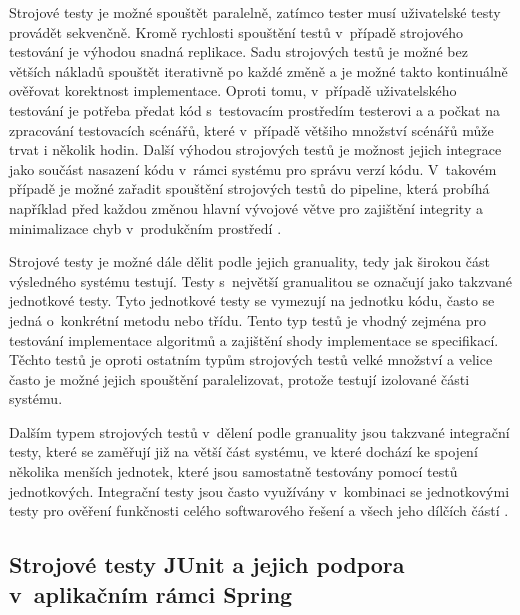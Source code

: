 Strojové testy je možné spouštět paralelně, zatímco tester musí uživatelské testy provádět sekvenčně. Kromě rychlosti spouštění testů v~případě strojového testování je výhodou snadná replikace. Sadu strojových testů je možné bez větších nákladů spouštět iterativně po každé změně a je možné takto kontinuálně ověřovat korektnost implementace. Oproti tomu, v~případě uživatelského testování je potřeba předat kód s~testovacím prostředím testerovi a a počkat na zpracování testovacích scénářů, které v~případě většiho množství scénářů může trvat i několik hodin. Další výhodou strojových testů je možnost jejich integrace jako součást nasazení kódu v~rámci systému pro správu verzí kódu. V~takovém případě je možné zařadit spouštění strojových testů do pipeline, která probíhá například před každou změnou hlavní vývojové větve pro zajištění integrity a minimalizace chyb v~produkčním prostředí \cite{Vance_2013}.

Strojové testy je možné dále dělit podle jejich granuality, tedy jak širokou část výsledného systému testují. Testy s~největší granualitou se označují jako takzvané jednotkové testy. Tyto jednotkové testy se vymezují na jednotku kódu, často se jedná o~konkrétní metodu nebo třídu. Tento typ testů je vhodný zejména pro testování implementace algoritmů a zajištění shody implementace se specifikací. Těchto testů je oproti ostatním typům strojových testů velké množství a velice často je možné jejich spouštění paralelizovat, protože testují izolované části systému. 

Dalším typem strojových testů v~dělení podle granuality jsou takzvané integrační testy, které se zaměřují již na větší část systému, ve které dochází ke spojení několika menších jednotek, které jsou samostatně testovány pomocí testů jednotkových.  Integrační testy jsou často využívány v~kombinaci se jednotkovými testy pro ověření funkčnosti celého softwarového řešení a všech jeho dílčích částí \cite{Vance_2013}.

\subsection{Strojové testy JUnit a jejich podpora v~aplikačním rámci Spring}

